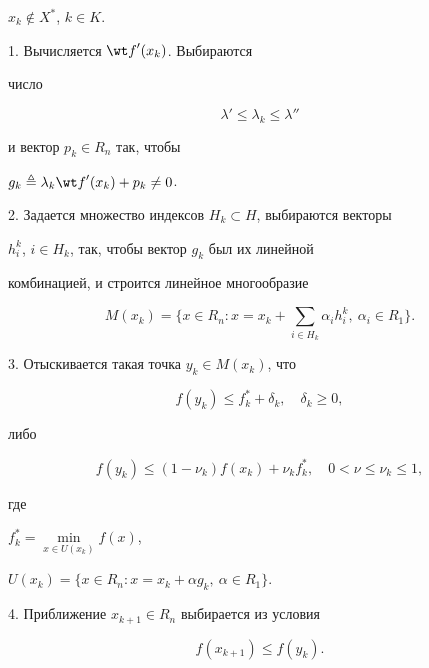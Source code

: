 $x_k\notin X^*$, $k\in K$.





1. Вычисляется ${\wt f}'(x_k)$. Выбираются


число 


\begin{equation}


{\lambda}'\le \lambda_k\le {\lambda}''


\end{equation}


и вектор $p_k\in R_n$ так, чтобы


$g_k\triangleq\lambda_k {\wt f}'(x_k)+p_k\neq 0$.





2. Задается множество индексов $H_k\subset H$, выбираются векторы


$h^k_i$, $i\in H_k$, так, чтобы вектор $g_k$ был их линейной


комбинацией, и строится линейное многообразие


$$


M(x_k)= \bigg\{{x\in R_n:x=x_k+


\sum_{i\in H_k}\alpha_ih^k_i,\ \alpha_i\in R_1} \bigg\}.


$$





3. Отыскивается такая точка $y_k\in M(x_k)$, что


\begin{equation}


f(y_k)\le f^*_k+\delta_k,\quad \delta_k\ge 0,


\end{equation}


либо


\begin{equation}


f(y_k)\le (1-\nu_k)f(x_k)+\nu_kf^*_k,\quad 0<\nu \le \nu_k\le 1,


\end{equation}


где


$f^*_k=\min\limits_{x\in U(x_k)}f(x)$,


$U(x_k)= \{{x\in R_n: x=x_k+\alpha g_k,\ \alpha\in R_1} \}$.





4. Приближение $x_{k+1}\in R_n$ выбирается из условия


\begin{equation}


f(x_{k+1})\le f(y_k).


\end{equation}





